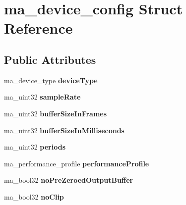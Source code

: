 \hypertarget{structma__device__config}{}\section{ma\+\_\+device\+\_\+config Struct Reference}
\label{structma__device__config}
\subsection*{Public Attributes}
\begin{DoxyCompactItemize}
\item 
\mbox{\label{structma__device__config_a176ed17b7a55d2df5bd4fc034332c204}} 
ma\+\_\+device\+\_\+type {\bfseries device\+Type}
\item 
\mbox{\label{structma__device__config_a6aa474f1db915567f81c0151acdc3c6c}} 
ma\+\_\+uint32 {\bfseries sample\+Rate}
\item 
\mbox{\label{structma__device__config_ada4d57bafcf150c3fed9285628efb366}} 
ma\+\_\+uint32 {\bfseries buffer\+Size\+In\+Frames}
\item 
\mbox{\label{structma__device__config_a4ac4b547e03170ce5d785f1e55a7bb09}} 
ma\+\_\+uint32 {\bfseries buffer\+Size\+In\+Milliseconds}
\item 
\mbox{\label{structma__device__config_aca9f945e436eceae921aef035e982ab7}} 
ma\+\_\+uint32 {\bfseries periods}
\item 
\mbox{\label{structma__device__config_a3e194444c1d0600e32a80956c975dda5}} 
ma\+\_\+performance\+\_\+profile {\bfseries performance\+Profile}
\item 
\mbox{\label{structma__device__config_af998b66d159c1d2d357a9450eee47c34}} 
ma\+\_\+bool32 {\bfseries no\+Pre\+Zeroed\+Output\+Buffer}
\item 
\mbox{\label{structma__device__config_af3d34ec045d53ad320c61b09e6d0a7bb}} 
ma\+\_\+bool32 {\bfseries no\+Clip}
\item 
\mbox{\label{structma__device__config_a597c796c7dd59a40de250adb0fd5ed47}} 

\end{DoxyCompactItemize}
